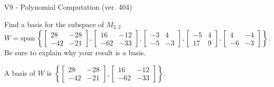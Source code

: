 \begin{exercise}
  \begin{exerciseTitle}V9 - Polynomial Computation (ver. 404)\end{exerciseTitle}
  \begin{exerciseStatement}
    Find a basis for the subspace of \(M_{2,2}\) 
\[W=\mathrm{span}\ \left\{\left[\begin{array}{cc}
28 & -28 \\
-42 & -21
\end{array}\right] , \left[\begin{array}{cc}
16 & -12 \\
-62 & -33
\end{array}\right] , \left[\begin{array}{cc}
-3 & 4 \\
-5 & -3
\end{array}\right] , \left[\begin{array}{cc}
-5 & 4 \\
17 & 9
\end{array}\right] , \left[\begin{array}{cc}
4 & -4 \\
-6 & -3
\end{array}\right]\right\}.\]
 Be sure to explain why your result is a basis.


  \end{exerciseStatement}
  \begin{exerciseAnswer}
   A basis of \(W\) is  \(\left\{\left[\begin{array}{cc}
28 & -28 \\
-42 & -21
\end{array}\right] , \left[\begin{array}{cc}
16 & -12 \\
-62 & -33
\end{array}\right]\right\}\).
  


  \end{exerciseAnswer}
\end{exercise}
